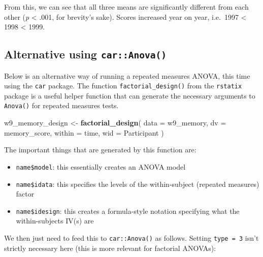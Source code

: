 \documentclass[
]{book}
\newenvironment{Shaded}{\begin{snugshade}}{\end{snugshade}}
\newcommand{\AttributeTok}[1]{\textcolor[rgb]{0.13,0.29,0.53}{#1}}
\newcommand{\DecValTok}[1]{\textcolor[rgb]{0.00,0.00,0.81}{#1}}
\newcommand{\FunctionTok}[1]{\textcolor[rgb]{0.13,0.29,0.53}{\textbf{#1}}}
\newcommand{\NormalTok}[1]{#1}
\newcommand{\OtherTok}[1]{\textcolor[rgb]{0.56,0.35,0.01}{#1}}
\newcommand{\SpecialCharTok}[1]{\textcolor[rgb]{0.81,0.36,0.00}{\textbf{#1}}}
\begin{document}
From this, we can see that all three means are significantly different from each other (\emph{p} \textless{} .001, for brevity's sake). Scores increased year on year, i.e.~1997 \textless{} 1998 \textless{} 1999.

\subsection{\texorpdfstring{Alternative using \texttt{car::Anova()}}{Alternative using car::Anova()}}\label{alternative-using-caranova}

Below is an alternative way of running a repeated measures ANOVA, this time using the \texttt{car} package. The function \texttt{factorial\_design()} from the \texttt{rstatix} package is a useful helper function that can generate the necessary arguments to \texttt{Anova()} for repeated measures tests.

\begin{Shaded}
\begin{Highlighting}[]
\NormalTok{w9\_memory\_design }\OtherTok{\textless{}{-}} \FunctionTok{factorial\_design}\NormalTok{(}
  \AttributeTok{data =}\NormalTok{ w9\_memory,}
  \AttributeTok{dv =}\NormalTok{ memory\_score,}
  \AttributeTok{within =}\NormalTok{ time,}
  \AttributeTok{wid =}\NormalTok{ Participant}
\NormalTok{)}
\end{Highlighting}
\end{Shaded}

The important things that are generated by this function are:

\begin{itemize}
\item
  \texttt{name\$model}: this essentially creates an ANOVA model
\item
  \texttt{name\$idata}: this specifies the levels of the within-subject
  (repeated measures) factor
\item
  \texttt{name\$idesign}: this creates a formula-style notation specifying
  what the within-subjects IV(s) are
\end{itemize}

We then just need to feed this to \texttt{car::Anova()} as follows. Setting \texttt{type\ =\ 3} isn't strictly necessary here (this is more relevant for factorial ANOVAs):

\begin{Shaded}
\end{Shaded}
\end{document}
